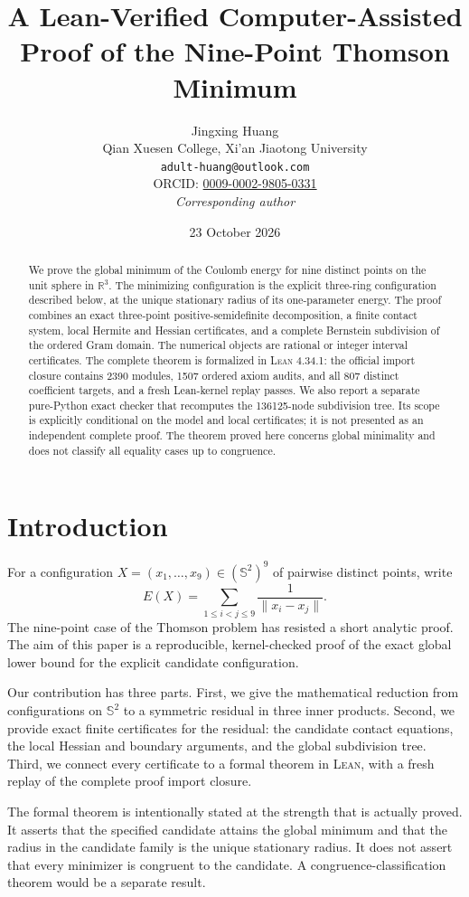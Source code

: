 \documentclass[11pt]{article}
\title{A Lean-Verified Computer-Assisted Proof of the Nine-Point Thomson Minimum}
\author{Jingxing Huang\\
Qian Xuesen College, Xi'an Jiaotong University\\
\texttt{adult-huang@outlook.com}\\
ORCID: \href{https://orcid.org/0009-0002-9805-0331}{0009-0002-9805-0331}\\[2pt]
\emph{Corresponding author}}
\date{23 October 2026}
\theoremstyle{definition}
\theoremstyle{remark}
\newcommand{\R}{\mathbb{R}}
\newcommand{\Sphere}{\mathbb{S}^2}
\newcommand{\Lean}{\textsc{Lean}}
\begin{document}
\maketitle

\begin{abstract}
We prove the global minimum of the Coulomb energy for nine distinct points on the unit sphere in $\R^3$.  The minimizing configuration is the explicit three-ring configuration described below, at the unique stationary radius of its one-parameter energy.  The proof combines an exact three-point positive-semidefinite decomposition, a finite contact system, local Hermite and Hessian certificates, and a complete Bernstein subdivision of the ordered Gram domain.  The numerical objects are rational or integer interval certificates.  The complete theorem is formalized in \Lean{} 4.34.1: the official import closure contains 2390 modules, 1507 ordered axiom audits, and all 807 distinct coefficient targets, and a fresh Lean-kernel replay passes.  We also report a separate pure-Python exact checker that recomputes the 136125-node subdivision tree.  Its scope is explicitly conditional on the model and local certificates; it is not presented as an independent complete proof.  The theorem proved here concerns global minimality and does not classify all equality cases up to congruence.
\end{abstract}

\section{Introduction}

For a configuration $X=(x_1,\ldots,x_9)\in(\Sphere)^9$ of pairwise distinct points, write
\[
 E(X)=\sum_{1\leq i<j\leq 9}\frac{1}{\lVert x_i-x_j\rVert}.
\]
The nine-point case of the Thomson problem has resisted a short analytic proof.  The aim of this paper is a reproducible, kernel-checked proof of the exact global lower bound for the explicit candidate configuration.

Our contribution has three parts.  First, we give the mathematical reduction from configurations on $\Sphere$ to a symmetric residual in three inner products.  Second, we provide exact finite certificates for the residual: the candidate contact equations, the local Hessian and boundary arguments, and the global subdivision tree.  Third, we connect every certificate to a formal theorem in \Lean{}, with a fresh replay of the complete proof import closure.

The formal theorem is intentionally stated at the strength that is actually proved.  It asserts that the specified candidate attains the global minimum and that the radius in the candidate family is the unique stationary radius.  It does not assert that every minimizer is congruent to the candidate.  A congruence-classification theorem would be a separate result.
\end{document}
